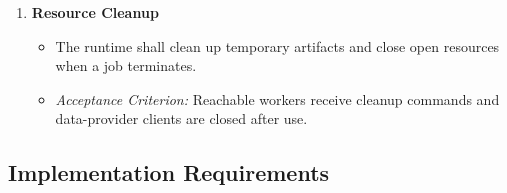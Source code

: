 \documentclass{scrartcl}
\begin{document}
\begin{enumerate}[label=\textbf{NFR-\arabic*}]
    \item \textbf{Resource Cleanup}
          \begin{itemize}
              \item The runtime shall clean up temporary artifacts and close open resources when a job terminates.
              \item \textit{Acceptance Criterion:} Reachable workers receive cleanup commands and data-provider clients are closed after use.
          \end{itemize}
\end{enumerate}

\subsection{Implementation Requirements}
\end{document}
